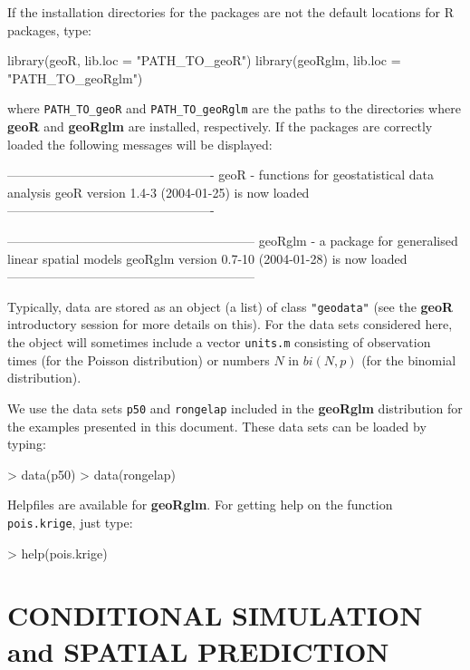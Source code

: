 \documentclass[12pt,a4paper]{article}
\newcommand{\strong}[1]{{\textbf{ #1}}}
\let\pkg=\strong
\newcommand{\code}[1]{\texttt{\small #1}}
\newcommand{\R}{{\textsf{R}}{}}
\let\command=\code
\begin{document}
If the installation directories for the packages are not the default locations for \R{} packages, type:
\begin{Rin}
  library(geoR, lib.loc = "PATH_TO_geoR")
  library(geoRglm, lib.loc = "PATH_TO_geoRglm")
\end{Rin}
where \verb+PATH_TO_geoR+ and \verb+PATH_TO_geoRglm+ are the paths to the directories where \pkg{geoR} and \pkg{geoRglm} are installed, respectively.
If the packages are correctly loaded the following messages will be displayed:
\begin{Schunk}
\begin{Soutput}
-------------------------------------------------
geoR - functions for geostatistical data analysis
geoR version 1.4-3 (2004-01-25) is now loaded
-------------------------------------------------
\end{Soutput}
\begin{Soutput}
-----------------------------------------------------------
geoRglm - a package for generalised linear spatial models
geoRglm version 0.7-10 (2004-01-28) is now loaded
-----------------------------------------------------------
\end{Soutput}
\end{Schunk}

Typically, data are stored as an object (a list) of class \code{"geodata"} (see the \pkg{geoR} introductory session 
for more details on this). For the data sets considered here, the object will sometimes include a vector \code{units.m} consisting 
of observation times (for the Poisson distribution) or numbers $N$ in $bi(N,p)$ (for the binomial distribution).

We use the data sets  \code{p50} and \code{rongelap} included in the \pkg{geoRglm} distribution for 
the examples presented in this document. These data sets can be loaded by typing:
\begin{Schunk}
\begin{Sinput}
> data(p50)
> data(rongelap)
\end{Sinput}
\end{Schunk}
Helpfiles are available for \pkg{geoRglm}. For getting help on the function \command{pois.krige}, just type:  
\begin{Rin}
> help(pois.krige)
\end{Rin}

\section{CONDITIONAL SIMULATION and SPATIAL PREDICTION}
\end{document}
